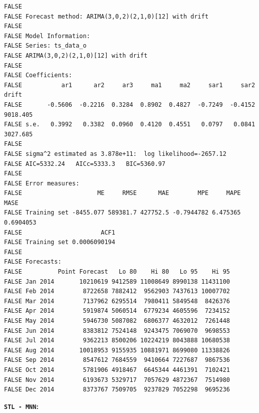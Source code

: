 \documentclass[openany]{book}
\begin{document}
\begin{verbatim}
FALSE 
FALSE Forecast method: ARIMA(3,0,2)(2,1,0)[12] with drift
FALSE 
FALSE Model Information:
FALSE Series: ts_data_o 
FALSE ARIMA(3,0,2)(2,1,0)[12] with drift 
FALSE 
FALSE Coefficients:
FALSE           ar1      ar2     ar3     ma1     ma2     sar1     sar2     drift
FALSE       -0.5606  -0.2216  0.3284  0.8902  0.4827  -0.7249  -0.4152  9018.405
FALSE s.e.   0.3992   0.3382  0.0960  0.4120  0.4551   0.0797   0.0841  3027.685
FALSE 
FALSE sigma^2 estimated as 3.878e+11:  log likelihood=-2657.12
FALSE AIC=5332.24   AICc=5333.3   BIC=5360.97
FALSE 
FALSE Error measures:
FALSE                     ME     RMSE      MAE        MPE     MAPE      MASE
FALSE Training set -8455.077 589381.7 427752.5 -0.7944782 6.475365 0.6904053
FALSE                      ACF1
FALSE Training set 0.0006090194
FALSE 
FALSE Forecasts:
FALSE          Point Forecast   Lo 80    Hi 80   Lo 95    Hi 95
FALSE Jan 2014       10210619 9412589 11008649 8990138 11431100
FALSE Feb 2014        8722658 7882412  9562903 7437613 10007702
FALSE Mar 2014        7137962 6295514  7980411 5849548  8426376
FALSE Apr 2014        5919874 5060514  6779234 4605596  7234152
FALSE May 2014        5946730 5087082  6806377 4632012  7261448
FALSE Jun 2014        8383812 7524148  9243475 7069070  9698553
FALSE Jul 2014        9362213 8500206 10224219 8043888 10680538
FALSE Aug 2014       10018953 9155935 10881971 8699080 11338826
FALSE Sep 2014        8547612 7684559  9410664 7227687  9867536
FALSE Oct 2014        5781906 4918467  6645344 4461391  7102421
FALSE Nov 2014        6193673 5329717  7057629 4872367  7514980
FALSE Dec 2014        8373767 7509705  9237829 7052298  9695236
\end{verbatim}

\textbf{\texttt{STL\ -\ MNN}:}
\end{document}
